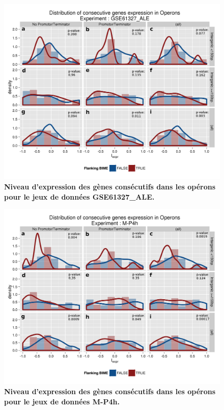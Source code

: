 \documentclass[12pt,a4paper]{report}
\begin{document}
\chapter{}
\label{annexeOperon}
\begin{figure}[!h]
\centerline{\includegraphics[scale=0.7]{figures/supData/genesOperon_histoDens_GSE61327_ALE.png}}
\caption{\textbf{Niveau d'expression des gènes consécutifs dans les opérons pour le jeux de données GSE61327\_ALE.}}
\end{figure}

\begin{figure}[!h]
\centerline{\includegraphics[scale=0.7]{figures/supData/genesOperon_histoDens_M-P4h.png}}
\caption{\textbf{Niveau d'expression des gènes consécutifs dans les opérons pour le jeux de données M-P4h.}}
\end{figure}
\end{document}
